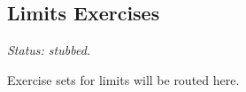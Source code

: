 \subsection*{Limits Exercises}

\textit{Status: stubbed.}

Exercise sets for limits will be routed here.
